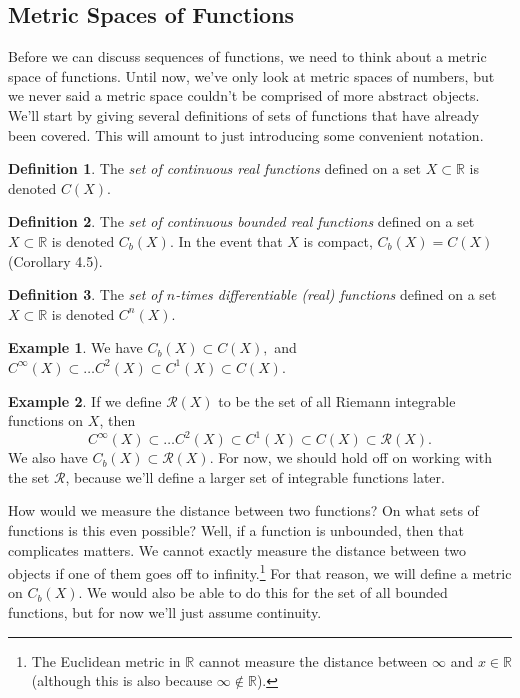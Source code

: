 \documentclass{article}
\newcommand{\R}{\mathbb{R}}
\theoremstyle{definition}
\newtheorem{definition}{Definition}[section]
\newtheorem{example}{Example}[section]
\begin{document}
	\subsection{Metric Spaces of Functions}
	Before we can discuss sequences of functions, we need to think about a metric space of functions. Until now, we've only look at metric spaces of numbers, but we never said a metric space couldn't be comprised of more abstract objects. We'll start by giving several definitions of sets of functions that have already been covered. This will amount to just introducing some convenient notation.
	\begin{definition}\label{def7.1}
		The \textit{\color{red}set of continuous real functions} defined on a set $ X\subset\R $ is denoted $ C(X)$. 
	\end{definition}
	\begin{definition}\label{def7.2}
		The \textit{\color{red}set of continuous bounded real functions} defined on a set $ X\subset\R $ is denoted $ C_b(X)$. In the event that $X$ is compact, $C_b(X) = C(X)$ (Corollary 4.5).
	\end{definition}
	\begin{definition}\label{def7.3}
		The \textit{\color{red}set of $ n $-times differentiable (real) functions} defined on a set $ X\subset\R $ is denoted $ C^n(X) $. 
	\end{definition}
	\begin{example}
		We have $ C_b(X)\subset C(X),$ and $C^\infty(X)\subset\ldots C^2(X)\subset C^1(X)\subset C(X) .$
	\end{example}
	\begin{example}
		If we define $ \mathscr{R}(X) $ to be the set of all Riemann integrable functions on $ X $, then $$C^\infty(X)\subset\ldots C^2(X)\subset C^1(X)\subset C(X)\subset\mathscr{R}(X) .$$ We also have $ C_b(X)\subset\mathscr{R}(X) $. For now, we should hold off on working with the set $ \mathscr{R} $, because we'll define a larger set of integrable functions later. 
	\end{example}
	How would we measure the distance between two functions? On what sets of functions is this even possible? Well, if a function is unbounded, then that complicates matters. We cannot exactly measure the distance between two objects if one of them goes off to infinity.\footnote{The Euclidean metric in $ \R $ cannot measure the distance between $ \infty $ and $ x\in\R $ (although this is also because $ \infty\notin\R $). } For that reason, we will define a metric on $ C_b(X) $. We would also be able to do this for the set of all bounded functions, but for now we'll just assume continuity. 
	
\end{document}

